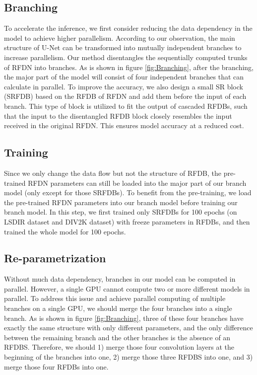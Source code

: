 \documentclass[10pt,twocolumn,letterpaper]{article}
\begin{document}
\subsection{Branching}
To accelerate the inference, we first consider reducing the data dependency in the model to achieve higher parallelism. 
According to our observation, the main structure of U-Net can be transformed into mutually independent branches to increase parallelism. 
Our method disentangles the sequentially computed trunks of RFDN into branches. 
As is shown in figure \ref{fig:Branching}, after the branching, the major part of the model will consist of four independent branches that can calculate in parallel. 
To improve the accuracy, we also design a small SR block (SRFDB) based on the RFDB of RFDN and add them before the input of each branch. 
This type of block is utilized to fit the output of cascaded RFDBs, such that the input to the disentangled RFDB block closely resembles the input received in the original RFDN.
This ensures model accuracy at a reduced cost.

\subsection{Training}
Since we only change the data flow but not the structure of RFDB, the pre-trained RFDN parameters can still be loaded into the major part of our branch model (only except for those SRFDBs). 
To benefit from the pre-training, we load the pre-trained RFDN parameters into our branch model before training our branch model.
In this step, we first trained only SRFDBs for 100 epochs (on LSDIR dataset and DIV2K dataset) with freeze parameters in RFDBs, and then trained the whole model for 100 epochs.

\subsection{Re-parametrization}
Without much data dependency, branches in our model can be computed in parallel. 
However, a single GPU cannot compute two or more different models in parallel. 
To address this issue and achieve parallel computing of multiple branches on a single GPU, we should merge the four branches into a single branch. 
As is shown in figure \ref{fig:Branching}, three of these four branches have exactly the same structure with only different parameters, and the only difference between the remaining branch and the other branches is the absence of an RFDBS.
Therefore, we should 1) merge those four convolution layers at the beginning of the branches into one, 2) merge those three RFDBS into one, and 3) merge those four RFDBs into one.
\end{document}
